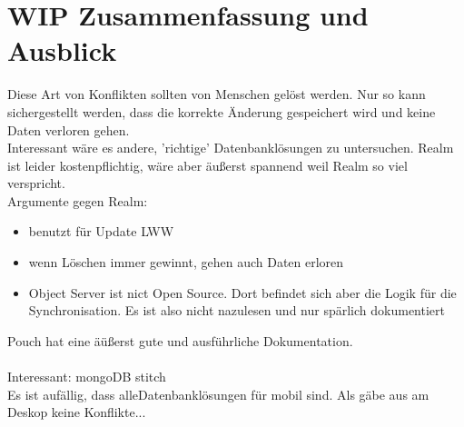\chapter{\label{chap:fazit}WIP Zusammenfassung und Ausblick}
Diese Art von Konflikten sollten von Menschen gelöst werden. Nur so kann sichergestellt werden, dass die korrekte Änderung gespeichert wird und keine Daten verloren gehen.\\

Interessant wäre es andere, 'richtige' Datenbanklösungen zu untersuchen. 
Realm ist leider kostenpflichtig, wäre aber äußerst spannend weil Realm so viel verspricht.\\
Argumente gegen Realm:
\begin{itemize}
  \item benutzt für Update LWW
  \item wenn Löschen immer gewinnt, gehen auch Daten erloren
  \item Object Server ist nict Open Source. Dort befindet sich aber die Logik für die Synchronisation. Es ist also nicht nazulesen und nur spärlich dokumentiert
\end{itemize}
Pouch hat eine äüßerst gute und ausführliche Dokumentation.\\\\
Interessant: mongoDB stitch \\
Es ist aufällig, dass alleDatenbanklösungen für mobil sind. Als gäbe aus am Deskop keine Konflikte...